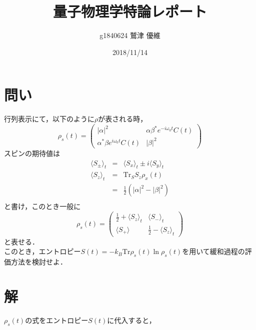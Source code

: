 \documentclass[10pt]{ujarticle}
\title{量子物理学特論レポート}
\author{g1840624 鷲津 優維}
\date{2018/11/14}
\begin{document}
\maketitle
\section{問い}
行列表示にて，以下のように$\rho$が表される時，
\[
\rho_s(t) = \left(
\begin{array}{cc}
|\alpha|^2 & \alpha \beta^{\ast} e^{-i\omega_0 t} C(t) \\
\alpha^{\ast} \beta e^{i\omega_0 t} C(t) & |\beta|^2
\end{array}
\right)
\]
スピンの期待値は
\begin{eqnarray*}
\langle S_\pm \rangle_t &=& \langle S_x \rangle_t \pm i \langle S_y \rangle_t \\
\langle S_z \rangle_t &=& \mathrm{Tr}_S S_z \rho_x(t) \\
&=& \frac{1}{2} (|\alpha|^2 - |\beta|^2)\\
\end{eqnarray*}
と書け，このとき一般に
\[
\rho_s(t) = \left(
\begin{array}{cc}
\frac{1}{2} + \langle S_z \rangle_t & \langle S_- \rangle_t \\
\langle S_+ \rangle & \frac{1}{2} - \langle S_z \rangle_t
\end{array}
\right)
\]
と表せる．\\
このとき，エントロピー$S(t) = -k_B \mathrm{Tr} \rho_s (t) \ln \rho_s(t)$を用いて緩和過程の評価方法を検討せよ．

\section{解}
$\rho_s(t)$の式をエントロピー$S(t)$に代入すると，
\end{document}
